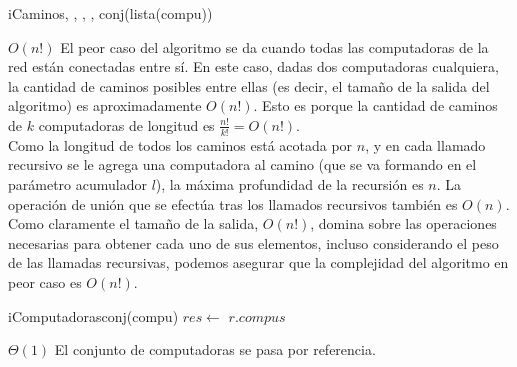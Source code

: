 \begin{Algoritmos}
  \begin{algoritmo}{iCaminos}{, , , , }{conj(lista(compu))}{}
  \end{algoritmo}
  {} %
  {} %
  {$O(n!)$} %
  {El peor caso del algoritmo se da cuando todas las computadoras de la red est\'an conectadas entre s\'i. En este caso, dadas dos computadoras cualquiera, la cantidad de caminos posibles entre ellas (es decir, el tama\~no de la salida del algoritmo) es aproximadamente $O(n!)$. Esto es porque la cantidad de caminos de $k$ computadoras de longitud es $\frac{n!}{k!} = O(n!)$. \\
  Como la longitud de todos los caminos est\'a acotada por $n$, y en cada llamado recursivo se le agrega una computadora al camino (que se va formando en el par\'ametro acumulador $l$), la m\'axima profundidad de la recursi\'on es $n$. La operaci\'on de uni\'on que se efect\'ua tras los llamados recursivos tambi\'en es $O(n)$. Como claramente el tama\~no de la salida, $O(n!)$, domina sobre las operaciones necesarias para obtener cada uno de sus elementos, incluso considerando el peso de las llamadas recursivas, podemos asegurar que la complejidad del algoritmo en peor caso es $O(n!)$.} %

  \begin{algoritmo}{iComputadoras}{}{conj(compu)}{}
    $res \gets$ $r$.$compus$ 
  \end{algoritmo}
  \datosAlgoritmo{} %
  {} %
  {} %
  {$\Theta(1)$} %
  {El conjunto de computadoras se pasa por referencia.} %
   

\end{Algoritmos}
